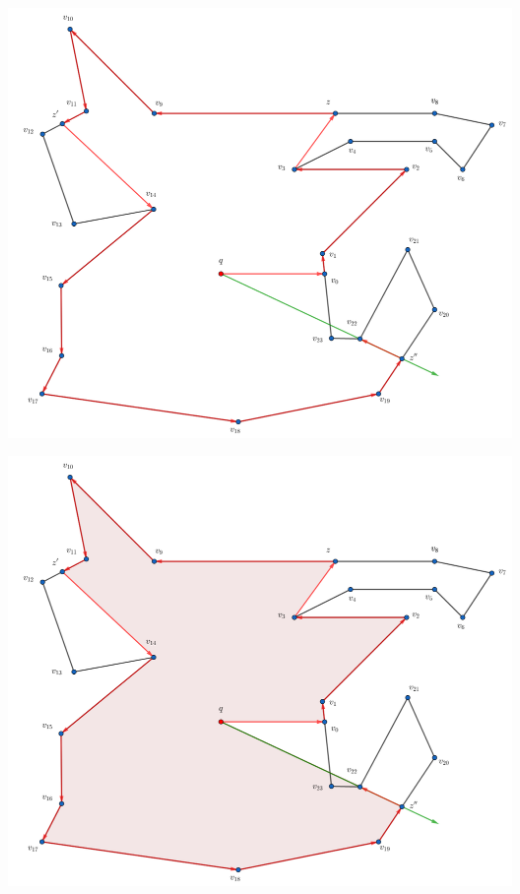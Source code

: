 \begin{frame}
  \centering \includegraphics[width=0.70 \paperwidth]{images/Ejecucion/e32.png}
\end{frame}

\begin{frame}
  \centering \includegraphics[width=0.70 \paperwidth]{images/Ejecucion/e33.png}
\end{frame}

